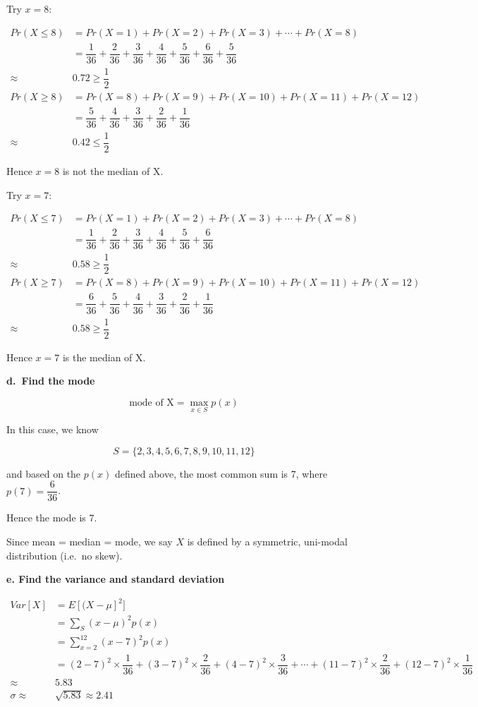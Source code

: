\documentclass[
]{article}
\begin{document}
Try \(x = 8\):

\[
\begin{aligned}
Pr(X \leq 8) &= Pr(X=1)+Pr(X=2)+Pr(X=3)+\cdots+Pr(X=8)\\
&= \dfrac{1}{36} + \dfrac{2}{36} + \dfrac{3}{36} + \dfrac{4}{36} + \dfrac{5}{36} + \dfrac{6}{36} + \dfrac{5}{36}\\
\approx&0.72 \geq \dfrac{1}{2}\\
Pr(X \geq 8) &= Pr(X=8)+Pr(X=9)+Pr(X=10)+Pr(X=11)+Pr(X=12)\\
&= \dfrac{5}{36} + \dfrac{4}{36} + \dfrac{3}{36} + \dfrac{2}{36} + \dfrac{1}{36} \\
\approx&0.42 \leq \dfrac{1}{2}
\end{aligned}
\]

Hence \(x = 8\) is not the median of X.

Try \(x = 7\):

\[
\begin{aligned}
Pr(X \leq 7) &= Pr(X=1)+Pr(X=2)+Pr(X=3)+\cdots+Pr(X=8)\\
&= \dfrac{1}{36} + \dfrac{2}{36} + \dfrac{3}{36} + \dfrac{4}{36} + \dfrac{5}{36} + \dfrac{6}{36}\\
\approx&0.58 \geq \dfrac{1}{2}\\
Pr(X \geq 7) &= Pr(X=8)+Pr(X=9)+Pr(X=10)+Pr(X=11)+Pr(X=12)\\
&= \dfrac{6}{36} + \dfrac{5}{36} + \dfrac{4}{36} + \dfrac{3}{36} + \dfrac{2}{36} + \dfrac{1}{36} \\
\approx&0.58 \geq \dfrac{1}{2}
\end{aligned}
\]

Hence \(x = 7\) is the median of X.

\textbf{d.~Find the mode}

\[
\text{mode of X} = \max_{x \in S}p(x)
\]

In this case, we know

\[
S = \{2,3,4,5,6,7,8,9,10,11,12\}
\]

and based on the \(p(x)\) defined above, the most common sum is 7, where
\(p(7) = \dfrac{6}{36}\).

Hence the mode is 7.

Since mean = median = mode, we say \(X\) is defined by a symmetric,
uni-modal distribution (i.e.~no skew).

\textbf{e. Find the variance and standard deviation}

\[
\begin{aligned}
Var[X] &= E[(X-\mu]^2]\\
&= \sum_S(x-\mu)^2p(x)\\
&= \sum_{x=2}^{12}(x-7)^2p(x)\\
&= (2-7)^2 \times \dfrac{1}{36} + (3-7)^2 \times \dfrac{2}{36} + (4-7)^2 \times \dfrac{3}{36} + \cdots + (11-7)^2 \times \dfrac{2}{36} + (12-7)^2 \times \dfrac{1}{36}\\
\approx& 5.83\\
\sigma\approx& \sqrt{5.83} \approx2.41
\end{aligned}
\]
\end{document}
